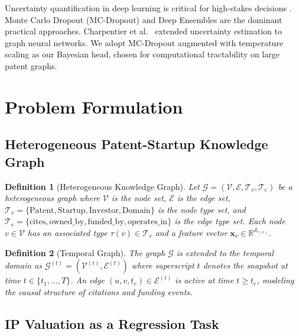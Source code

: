 \documentclass[journal]{IEEEtran}
\newtheorem{definition}{Definition}
\begin{document}
Uncertainty quantification in deep learning is critical for high-stakes decisions \cite{gal2016dropout}. Monte Carlo Dropout (MC-Dropout) \cite{gal2016dropout} and Deep Ensembles \cite{lakshminarayanan2017simple} are the dominant practical approaches. Charpentier et al.~\cite{charpentier2020posterior} extended uncertainty estimation to graph neural networks. We adopt MC-Dropout augmented with temperature scaling \cite{guo2017calibration} as our Bayesian head, chosen for computational tractability on large patent graphs.

\section{Problem Formulation}

\subsection{Heterogeneous Patent-Startup Knowledge Graph}

\begin{definition}[Heterogeneous Knowledge Graph]
Let $\mathcal{G} = (\mathcal{V}, \mathcal{E}, \mathcal{T}_v, \mathcal{T}_e)$ be a heterogeneous graph where $\mathcal{V}$ is the node set, $\mathcal{E}$ is the edge set, $\mathcal{T}_v = \{\text{Patent}, \text{Startup}, \text{Investor}, \text{Domain}\}$ is the node type set, and $\mathcal{T}_e = \{\text{cites}, \text{owned\_by}, \text{funded\_by}, \text{operates\_in}\}$ is the edge type set. Each node $v \in \mathcal{V}$ has an associated type $\tau(v) \in \mathcal{T}_v$ and a feature vector $\mathbf{x}_v \in \mathbb{R}^{d_{\tau(v)}}$.
\end{definition}

\begin{definition}[Temporal Graph]
The graph $\mathcal{G}$ is extended to the temporal domain as $\mathcal{G}^{(t)} = (\mathcal{V}^{(t)}, \mathcal{E}^{(t)})$ where superscript $t$ denotes the snapshot at time $t \in \{t_1, \ldots, T\}$. An edge $(u, v, t_e) \in \mathcal{E}^{(t)}$ is active at time $t \geq t_e$, modeling the causal structure of citations and funding events.
\end{definition}

\subsection{IP Valuation as a Regression Task}
\end{document}
